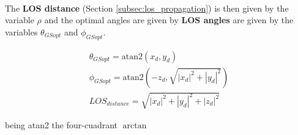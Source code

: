 \paragraph{} The \textbf{LOS distance} (Section \ref{subsec:los_propagation}) is then given by the variable $\rho$ and the optimal angles are given by \textbf{LOS angles} are given by the variables $\theta_{GSopt}$ and $\phi_{GSopt}$.

\begin{align}
  \theta_{GSopt} = \text{atan2}\left(x_{d}, y_{d}\right)\\
  \phi_{GSopt}=  \text{atan2}\left(-z_{d}, \sqrt{|x_{d}|^{2}+|y_{d}|^{2}}\right)\\
  LOS_{distance} = \sqrt{|x_{d}|^{2}+|y_{d}|^{2}+|z_{d}|^{2}}
  \label{eq:OptGS}
\end{align}

being atan2 the four-cuadrant $\arctan$ 

